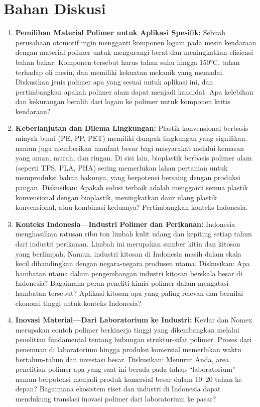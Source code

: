 \documentclass[12pt,a4paper,openany]{book}
\begin{document}
\section{Bahan Diskusi}
\label{sec:diskusi-bab2}

\begin{enumerate}

\item \textbf{Pemilihan Material Polimer untuk Aplikasi Spesifik:} Sebuah perusahaan otomotif ingin mengganti komponen logam pada mesin kendaraan dengan material polimer untuk mengurangi berat dan meningkatkan efisiensi bahan bakar. Komponen tersebut harus tahan suhu hingga 150°C, tahan terhadap oli mesin, dan memiliki kekuatan mekanik yang memadai. Diskusikan jenis polimer apa yang sesuai untuk aplikasi ini, dan pertimbangkan apakah polimer alam dapat menjadi kandidat. Apa kelebihan dan kekurangan beralih dari logam ke polimer untuk komponen kritis kendaraan?

\item \textbf{Keberlanjutan dan Dilema Lingkungan:} Plastik konvensional berbasis minyak bumi (PE, PP, PET) memiliki dampak lingkungan yang signifikan, namun juga memberikan manfaat besar bagi masyarakat melalui kemasan yang aman, murah, dan ringan. Di sisi lain, bioplastik berbasis polimer alam (seperti TPS, PLA, PHA) sering memerlukan lahan pertanian untuk memproduksi bahan bakunya, yang berpotensi bersaing dengan produksi pangan. Diskusikan: Apakah solusi terbaik adalah mengganti semua plastik konvensional dengan bioplastik, meningkatkan daur ulang plastik konvensional, atau kombinasi keduanya? Pertimbangkan konteks Indonesia.

\item \textbf{Konteks Indonesia---Industri Polimer dan Perikanan:} Indonesia menghasilkan ratusan ribu ton limbah kulit udang dan kepiting setiap tahun dari industri perikanan. Limbah ini merupakan sumber kitin dan kitosan yang berlimpah. Namun, industri kitosan di Indonesia masih dalam skala kecil dibandingkan dengan negara-negara produsen utama. Diskusikan: Apa hambatan utama dalam pengembangan industri kitosan berskala besar di Indonesia? Bagaimana peran peneliti kimia polimer dalam mengatasi hambatan tersebut? Aplikasi kitosan apa yang paling relevan dan bernilai ekonomi tinggi untuk konteks Indonesia?

\item \textbf{Inovasi Material---Dari Laboratorium ke Industri:} Kevlar dan Nomex merupakan contoh polimer berkinerja tinggi yang dikembangkan melalui penelitian fundamental tentang hubungan struktur-sifat polimer. Proses dari penemuan di laboratorium hingga produksi komersial memerlukan waktu bertahun-tahun dan investasi besar. Diskusikan: Menurut Anda, area penelitian polimer apa yang saat ini berada pada tahap ``laboratorium'' namun berpotensi menjadi produk komersial besar dalam 10--20 tahun ke depan? Bagaimana ekosistem riset dan industri di Indonesia dapat mendukung translasi inovasi polimer dari laboratorium ke pasar?

\end{enumerate}
\end{document}
